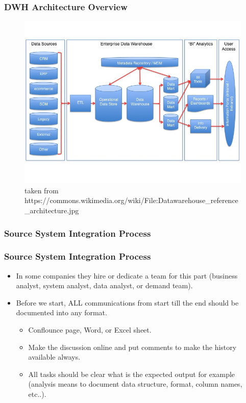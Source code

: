 \begin{frame}
\frametitle{DWH Architecture Overview}
\begin{figure}[ht]
	\centering
	\includegraphics[width=.9\linewidth,height=.8\textheight]{./Figures/chapter-01/Datawarehouse_reference_architecture.jpg}
	\caption{taken from https://commons.wikimedia.org/wiki/File:Datawarehouse\_reference\_architecture.jpg}
\end{figure}
\end{frame}

\subsubsection{Source System Integration Process}
\begin{frame}
\frametitle{Source System Integration Process}
\begin{itemize}[<+->]
\item In some companies they hire or dedicate a team for this part (business analyst, system analyst, data analyst, or demand team).
\item Before we start, ALL communications from start till the end should be documented into any format.
	\begin{itemize}
		\item  Conflounce page, Word, or Excel sheet.
		\item  Make the discussion online and put comments to make the history available always.
		\item  All tasks should be clear what is the expected output for example (analysis means to document data structure, format, column names, etc..).
	\end{itemize}
\end{itemize}

\end{frame}

